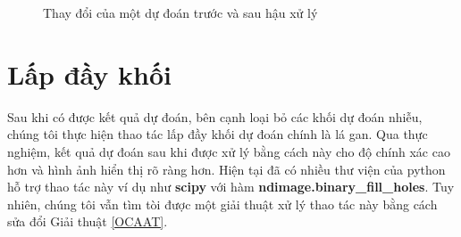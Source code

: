 \begin{figure}
  \centering
  \caption{Thay đổi của một dự đoán trước và sau hậu xử lý}
  \label{fig:post_process}
\end{figure}

\section{Lấp đầy khối}
Sau khi có được kết quả dự đoán, bên cạnh loại bỏ các khối dự đoán nhiễu, chúng tôi thực hiện thao tác lấp đầy khối dự đoán chính là lá gan. Qua thực nghiệm, kết quả dự đoán sau khi được xử lý bằng cách này cho độ chính xác cao hơn và hình ảnh hiển thị rõ ràng hơn. Hiện tại đã có nhiều thư viện của python hỗ trợ thao tác này ví dụ như \textbf{scipy} với hàm \textbf{ndimage.binary\_fill\_holes}. Tuy nhiên, chúng tôi vẫn tìm tòi được một giải thuật xử lý thao tác này bằng cách sửa đổi Giải thuật \ref{OCAAT}.

